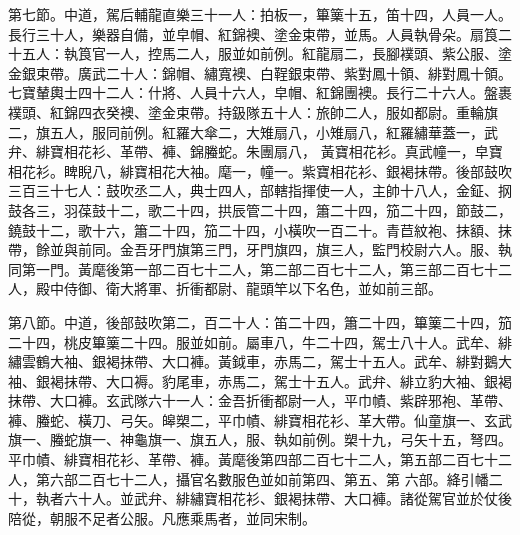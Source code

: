 \begin{pinyinscope}
 第七節。中道，駕后輔龍直樂三十一人：拍板一，篳篥十五，笛十四，人員一人。長行三十人，樂器自備，並皁帽、紅錦襖、塗金束帶，並馬。人員執骨朵。扇筤二十五人：執筤官一人，控馬二人，服並如前例。紅龍扇二，長腳襆頭、紫公服、塗金銀束帶。廣武二十人：錦帽、繡寬襖、白鞓銀束帶、紫對鳳十領、緋對鳳十領。七寶輦輿士四十二人：什將、人員十六人，皁帽、紅錦團襖。長行二十六人。盤裹襆頭、紅錦四衣癸襖、塗金束帶。持鈒隊五十人：旅帥二人，服如都尉。重輪旗二，旗五人，服同前例。紅羅大傘二，大雉扇八，小雉扇八，紅羅繡華蓋一，武弁、緋寶相花衫、革帶、褲、錦螣蛇。朱團扇八，
 黃寶相花衫。真武幢一，皁寶相花衫。睥睨八，緋寶相花大袖。麾一，幢一。紫寶相花衫、銀褐抹帶。後部鼓吹三百三十七人：鼓吹丞二人，典士四人，部轄指揮使一人，主帥十八人，金鉦、㧏鼓各三，羽葆鼓十二，歌二十四，拱辰管二十四，簫二十四，笳二十四，節鼓二，鐃鼓十二，歌十六，簫二十四，笳二十四，小橫吹一百二十。青苣紋袍、抹額、抹帶，餘並與前同。金吾牙門旗第三門，牙門旗四，旗三人，監門校尉六人。服、執同第一門。黃麾後第一部二百七十二人，第二部二百七十二人，第三部二百七十二人，殿中侍御、衛大將軍、折衝都尉、龍頭竿以下名色，並如前三部。



 第八節。中道，後部鼓吹第二，百二十人：笛二十四，簫二十四，篳篥二十四，笳二十四，桃皮篳篥二十四。服並如前。屬車八，牛二十四，駕士八十人。武牟、緋繡雲鶴大袖、銀褐抹帶、大口褲。黃鉞車，赤馬二，駕士十五人。武牟、緋對鵝大袖、銀褐抹帶、大口褥。豹尾車，赤馬二，駕士十五人。武弁、緋立豹大袖、銀褐抹帶、大口褲。玄武隊六十一人：金吾折衝都尉一人，平巾幘、紫辟邪袍、革帶、褲、螣蛇、橫刀、弓矢。皞槊二，平巾幘、緋寶相花衫、革大帶。仙童旗一、玄武旗一、螣蛇旗一、神龜旗一、旗五人，服、執如前例。槊十九，弓矢十五，弩四。平巾幘、緋寶相花衫、革帶、褲。黃麾後第四部二百七十二人，第五部二百七十二人，第六部二百七十二人，攝官名數服色並如前第四、第五、第
 六部。絳引幡二十，執者六十人。並武弁、緋繡寶相花衫、銀褐抹帶、大口褲。諸從駕官並於仗後陪從，朝服不足者公服。凡應乘馬者，並同宋制。



\end{pinyinscope}